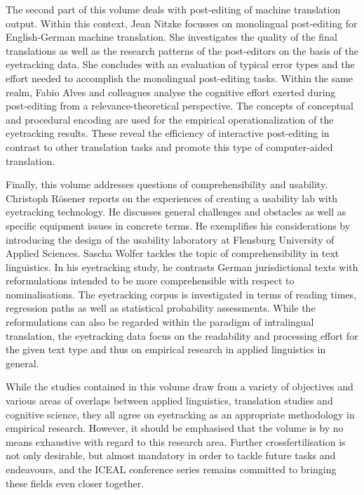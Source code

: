 \documentclass[output=paper]{langsci/langscibook}
\begin{document}
The second part of this volume deals with post-editing of machine translation output. Within this context, Jean Nitzke focusses on monolingual post-editing for English-German machine translation. She investigates the quality of the final translations as well as the research patterns of the post-editors on the basis of the eyetracking data. She concludes with an evaluation of typical error types and the effort needed to accomplish the monolingual post-editing tasks. Within the same realm, Fabio Alves and colleagues analyse the cognitive effort exerted during post-editing from a relevance-theoretical perspective. The concepts of conceptual and procedural encoding are used for the empirical operationalization of the eyetracking results. These reveal the efficiency of interactive post-editing in contrast to other translation tasks and promote this type of computer-aided translation.

Finally, this volume addresses questions of comprehensibility and usability. Christoph Rösener reports on the experiences of creating a usability lab with eyetracking technology. He discusses general challenges and obstacles as well as specific equipment issues in concrete terms. He exemplifies his considerations by introducing the design of the usability laboratory at Flensburg University of Applied Sciences. Sascha Wolfer tackles the topic of comprehensibility in text linguistics. In his eyetracking study, he contrasts German jurisdictional texts with reformulations intended to be more comprehensible with respect to nominalisations. The eyetracking corpus is investigated in terms of reading times, regression paths as well as statistical probability assessments. While the reformulations can also be regarded within the paradigm of intralingual translation, the eyetracking data focus on the readability and processing effort for the given text type and thus on empirical research in applied linguistics in general.

While the studies contained in this volume draw from a variety of objectives and various areas of overlaps between applied linguistics, translation studies and cognitive science, they all agree on eyetracking as an appropriate methodology in empirical research. However, it should be emphasised that the volume is by no means exhaustive with regard to this research area. Further crossfertilisation is not only desirable, but almost mandatory in order to tackle future tasks and endeavours, and the ICEAL conference series remains committed to bringing these fields even closer together.
\end{document}
